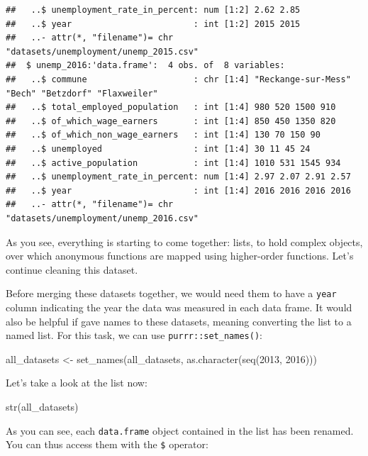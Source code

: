 \documentclass[
]{article}
\newenvironment{Shaded}{\begin{snugshade}}{\end{snugshade}}
\newcommand{\DecValTok}[1]{\textcolor[rgb]{0.00,0.00,0.81}{#1}}
\newcommand{\FunctionTok}[1]{\textcolor[rgb]{0.00,0.00,0.00}{#1}}
\newcommand{\NormalTok}[1]{#1}
\newcommand{\OtherTok}[1]{\textcolor[rgb]{0.56,0.35,0.01}{#1}}
\begin{document}
\begin{verbatim}
##   ..$ unemployment_rate_in_percent: num [1:2] 2.62 2.85
##   ..$ year                        : int [1:2] 2015 2015
##   ..- attr(*, "filename")= chr "datasets/unemployment/unemp_2015.csv"
##  $ unemp_2016:'data.frame':  4 obs. of  8 variables:
##   ..$ commune                     : chr [1:4] "Reckange-sur-Mess" "Bech" "Betzdorf" "Flaxweiler"
##   ..$ total_employed_population   : int [1:4] 980 520 1500 910
##   ..$ of_which_wage_earners       : int [1:4] 850 450 1350 820
##   ..$ of_which_non_wage_earners   : int [1:4] 130 70 150 90
##   ..$ unemployed                  : int [1:4] 30 11 45 24
##   ..$ active_population           : int [1:4] 1010 531 1545 934
##   ..$ unemployment_rate_in_percent: num [1:4] 2.97 2.07 2.91 2.57
##   ..$ year                        : int [1:4] 2016 2016 2016 2016
##   ..- attr(*, "filename")= chr "datasets/unemployment/unemp_2016.csv"
\end{verbatim}

As you see, everything is starting to come together: lists, to hold complex objects, over which anonymous
functions are mapped using higher-order functions. Let's continue cleaning this dataset.

Before merging these datasets together, we would need them to have a \texttt{year} column indicating the
year the data was measured in each data frame. It would also be helpful if gave names to these datasets, meaning
converting the list to a named list. For this task, we can use \texttt{purrr::set\_names()}:

\begin{Shaded}
\begin{Highlighting}[]
\NormalTok{all\_datasets }\OtherTok{\textless{}{-}} \FunctionTok{set\_names}\NormalTok{(all\_datasets, }\FunctionTok{as.character}\NormalTok{(}\FunctionTok{seq}\NormalTok{(}\DecValTok{2013}\NormalTok{, }\DecValTok{2016}\NormalTok{)))}
\end{Highlighting}
\end{Shaded}

Let's take a look at the list now:

\begin{Shaded}
\begin{Highlighting}[]
\FunctionTok{str}\NormalTok{(all\_datasets)}
\end{Highlighting}
\end{Shaded}

As you can see, each \texttt{data.frame} object contained in the list has been renamed. You can thus
access them with the \texttt{\$} operator:
\end{document}

